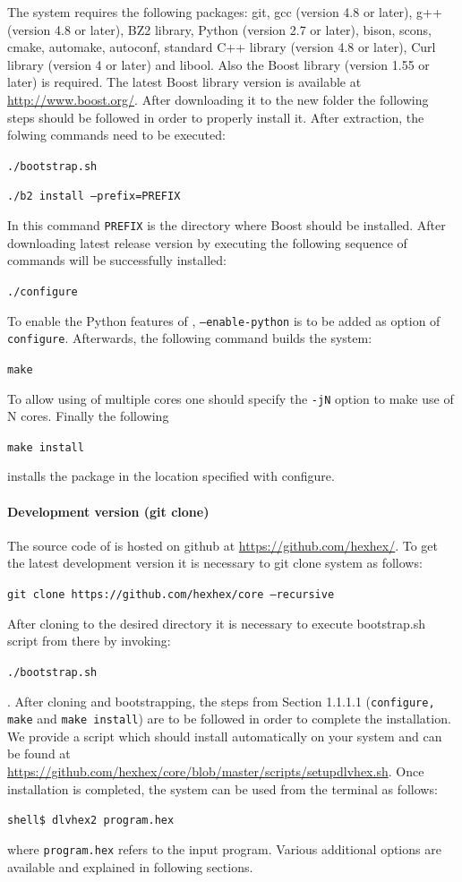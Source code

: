 \documentclass[14pt,a4paper, titlepage]{article}
\begin{document}
The system requires the following packages: git, gcc (version 4.8 or later), g++ (version 4.8 or later), BZ2 library, Python (version 2.7 or later), bison, scons, cmake, automake, autoconf, standard C++ library (version 4.8 or later), Curl library (version 4 or later) and libool. Also the Boost library (version 1.55 or later) is required. The latest Boost library version is available at \url{http://www.boost.org/}. After downloading it to the new folder the following steps should be followed in order to properly install it. After extraction, the folwing commands need to be executed:
\\ \centerline{\texttt{./bootstrap.sh}}
\centerline{\texttt{./b2 install --prefix=PREFIX}} In this command \texttt{PREFIX} is the directory where Boost should be installed. After downloading latest release version by executing the following sequence of commands \dlvhex{} will be successfully installed:
\\ \centerline{\texttt{./configure}} To enable the Python features of \dlvhex{}, \texttt{--enable-python} is to be added as option of \texttt{configure}. Afterwards, the following command builds the system:
\\ \centerline{\texttt{make}} To allow using of multiple cores one should specify the \texttt{-jN} option to make use of N cores. Finally the following
\\ \centerline{\texttt{make install}} installs the package in the location specified with configure.  
   
\paragraph{Development version (git clone)}
The source code of \dlvhex{} is hosted on github at \url{https://github.com/hexhex/}. To get the latest development version it is necessary to git clone system as follows:
\\ \centerline{\texttt{git clone https://github.com/hexhex/core --recursive}} 
After cloning to the desired directory it is necessary to execute bootstrap.sh script from there by invoking: \\ \centerline{\texttt{./bootstrap.sh}}. 
After cloning and bootstrapping, the steps from Section 1.1.1.1 (\texttt{configure, make} and \texttt{make install}) are to be followed in order to complete the installation.
We provide a script which should install \dlvhex{} automatically on your system and can be found at \url{https://github.com/hexhex/core/blob/master/scripts/setupdlvhex.sh}.
Once installation is completed, the system can be used from the terminal as follows:\\ 
\centerline{\texttt{shell\$ dlvhex2 program.hex}} where \texttt{program.hex} refers to the input program. Various additional options are available and explained in following sections.    
\end{document}
